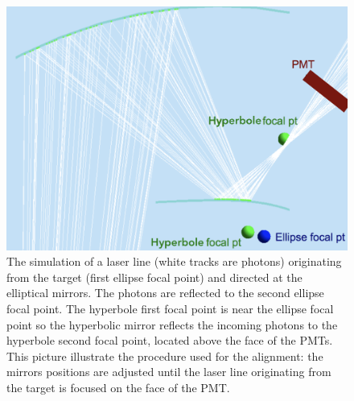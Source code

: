 \begin{figure}
\centering
	\includegraphics[width=0.99\columnwidth,  height=0.75\columnwidth]{img/mirrorAlignmentSimulationZoomed.png}
	\caption{The simulation of a laser line (white tracks are photons) originating from the target (first ellipse focal point) and directed at the elliptical mirrors.
            The photons are reflected to the second ellipse focal point. The hyperbole first focal point is near the ellipse focal point so the hyperbolic mirror
			   reflects the incoming photons to the hyperbole second focal point, located above the face of the PMTs.
			   This picture illustrate the procedure used for the alignment: the mirrors positions are adjusted until the laser line originating from
				the target is focused on the face of the PMT.}
	\label{fig:alignmentSimulation}
\end{figure}



